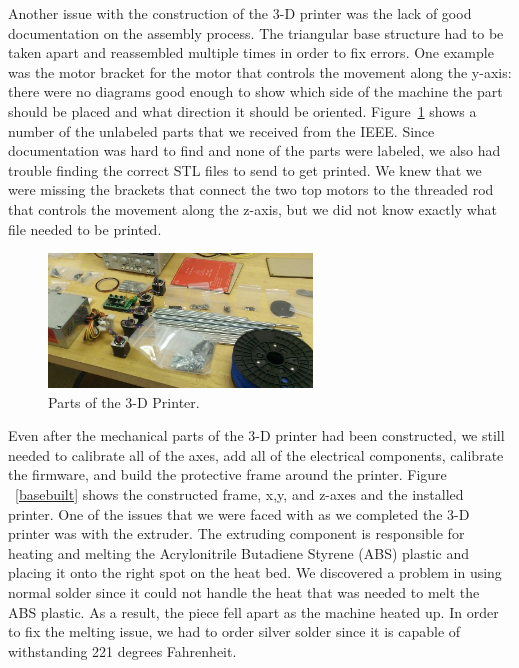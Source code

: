 \documentclass[pdftex,10.5pt]{report}
\begin{document}
Another issue with the construction of the 3-D printer was the lack of good documentation on the assembly process. The triangular base structure had to be taken apart and reassembled multiple times in order to fix errors. One example was the motor bracket for the motor that controls the movement along the y-axis: there were no diagrams good enough to show which side of the machine the part should be placed and what direction it should be oriented. Figure~\ref{parts} shows a number of the unlabeled parts that we received from the IEEE. Since documentation was hard to find and none of the parts were labeled, we also had trouble finding the correct STL files to send to get printed. We knew that we were missing the brackets that connect the two top motors to the threaded rod that controls the movement along the z-axis, but we did not know exactly what file needed to be printed.

\begin{figure}[H]
	\centering
	\includegraphics[width=70mm]{figures/WP_20130223_002.jpg}
	\caption{Parts of the 3-D  Printer.}
	\label{parts}
\end{figure}

Even after the mechanical parts of the 3-D printer had been constructed, we still needed to calibrate all of the axes, add all of the electrical components, calibrate the firmware, and build the protective frame around the printer. Figure ~\ref{basebuilt} shows the constructed frame, x,y, and z-axes and the installed printer. One of the issues that we were faced with as we completed the 3-D printer was with the extruder. The extruding component is responsible for heating and melting the Acrylonitrile Butadiene Styrene (ABS) plastic and placing it onto the right spot on the heat bed. We discovered a problem in using normal solder since it could not handle the heat that was needed to melt the ABS plastic. As a result, the piece fell apart as the machine heated up. In order to fix the melting issue, we had to order silver solder since it is capable of withstanding 221 degrees Fahrenheit.
\end{document}
